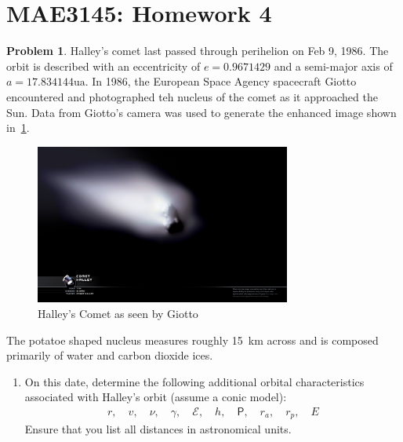 \documentclass[10pt]{article}
\date{}
\theoremstyle{definition}
\newtheorem{prob}{Problem}[section]
\newenvironment{subprob}%
{\renewcommand{\theenumi}{\alph{enumi}}\renewcommand{\labelenumi}{(\theenumi)}\begin{enumerate}}%
{\end{enumerate}}%
\begin{document}
\setcounter{page}{1}
\pagestyle{plain}
\section*{MAE3145: Homework 4}
\vspace*{-0.4cm}

\begin{prob}
    Halley's comet last passed through perihelion on Feb 9, 1986.
    The orbit is described with an eccentricity of \( e = 0.9671429\) and a semi-major axis of \( a = 17.834144 \si{\astronomicalunit} \).
    In 1986, the European Space Agency spacecraft Giotto encountered and photographed teh nucleus of the comet as it approached the Sun.
    Data from Giotto's camera was used to generate the enhanced image shown in~\cref{fig:halley}.
    \begin{figure}[htbp]
        \centering
        \includegraphics[width=0.75\textwidth, keepaspectratio]{figures/halley.jpg}
        \caption{Halley's Comet as seen by Giotto\label{fig:halley}}
    \end{figure}
    The potatoe shaped nucleus measures roughly \SI{15}{\kilo\meter} across and is composed primarily of water and carbon dioxide ices.

    \begin{subprob}
    \item On this date, determine the following additional orbital characteristics associated with Halley's orbit (assume a conic model):
        \begin{align*}
            r, \quad v, \quad \nu, \quad \gamma, \quad \mathcal{E}, \quad h, \quad \mathsf{P}, \quad r_a, \quad r_p, \quad E
        \end{align*}
        Ensure that you list all distances in astronomical units.
    \end{subprob}


\end{prob}
\end{document}
